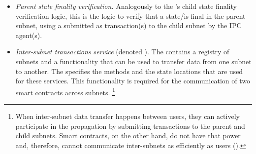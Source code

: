 \begin{enumerate}
\begin{itemize}
        \item \emph{Parent state finality verification.} Analogously to the \sa's child state finality verification logic,
        this is the logic to verify that a state/\tx is final in the parent subnet,
        using a \pof submitted as transaction(s) to the child subnet by the IPC agent(s).
        \item \emph{Inter-subnet transactions service} (denoted \postoffice).
        The \gw contains a registry of subnets and a functionality that can be used to transfer data from one subnet to another. 
        The \postoffice specifies the methods and the state locations that are used for these services.
        This functionality is required for the communication of two smart contracts across subnets.%
\footnote{When inter-subnet data transfer happens between users, they can actively participate in the propagation by submitting transactions to the parent and child subnets. Smart contracts, on the other hand, do not have that power and, therefore, cannot communicate inter-subnets as efficiently as users (\eoa).}
    \end{itemize}
\end{enumerate}

